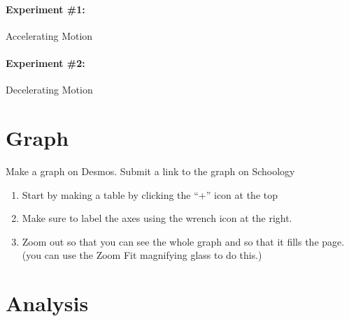 \documentclass[10pt]{exam}
\begin{document}
  \paragraph{Experiment \#1:} Accelerating Motion

    \datatable

  \paragraph{Experiment \#2:} Decelerating Motion

    \datatable

  
  \section*{Graph} 
    Make a graph on Desmos.  Submit a link to the graph on Schoology
    
    \begin{enumerate}[label=\alph*),topsep=0pt,itemsep=-1ex,partopsep=1ex,parsep=1ex]
      \item 
        Start by making a table by clicking the “+” icon at the top 
      \item
        Make sure to label the axes using the wrench icon at the right.
      \item
        Zoom out so that you can see the whole graph and so that it fills the page. (you can use the Zoom Fit magnifying glass to do this.)
    \end{enumerate}


\section*{Analysis}
\end{document}
